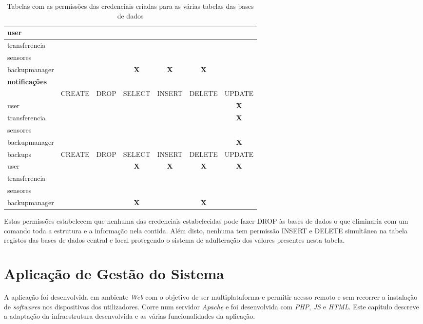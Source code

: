 \documentclass[11pt,twoside,a4paper]{report}
\begin{document}
\begin{table}
\begin{tabular}{|l|c|c|c|c|c|c|}
		user & & & & & & \\ \hline
		transferencia & & & & & & \\ \hline
		sensores & & & & & & \\ \hline
		backupmanager & & & \textbf{X} & \textbf{X} & \textbf{X} & \\ \hline
		\multicolumn{7}{l}{\textbf{notificações}} \\ \hline
		\makecell{atualizar} & CREATE & DROP & SELECT & INSERT & DELETE & UPDATE \\ \hline
		user & & & & & & \textbf{X} \\ \hline
		transferencia & & & & & & \textbf{X} \\ \hline
		sensores & & & & & & \\ \hline
		backupmanager & & & & & & \textbf{X} \\ \hline
		backups & CREATE & DROP & SELECT & INSERT & DELETE & UPDATE \\ \hline
		user & & & \textbf{X} & \textbf{X} & \textbf{X} & \textbf{X} \\ \hline
		transferencia & & & & & & \\ \hline
		sensores & & & & & & \\ \hline
		backupmanager & & & \textbf{X} & & \textbf{X} & \\ \hline
	\end{tabular}
	\caption{Tabelas com as permissões das credenciais criadas para as várias tabelas das bases de dados}
	\label{tab:utilizadores1}
\end{table}
Estas permissões estabelecem que nenhuma das credenciais estabelecidas pode fazer DROP às bases de dados o que eliminaria com um comando toda a estrutura e a informação nela contida. Além disto, nenhuma tem permissão INSERT e DELETE simultânea na tabela registos das bases de dados central e local protegendo o sistema de adulteração dos valores presentes nesta tabela.

\cleardoublepage
\chapter{Aplicação de Gestão do Sistema}
\label{chap:aplicacao}
A aplicação foi desenvolvida em ambiente  \textit{Web} com o objetivo de ser multiplataforma e permitir acesso remoto e sem recorrer a instalação de \textit{softwares} nos dispositivos dos utilizadores. Corre num servidor \textit{Apache} e foi desenvolvida com \textit{PHP}, \textit{JS} e \textit{HTML}. Este capítulo descreve a adaptação da infraestrutura desenvolvida e as várias funcionalidades da aplicação.
\end{document}
